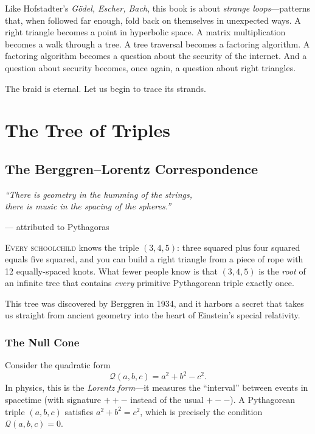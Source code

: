 \documentclass[11pt,twoside,openright]{book}
\theoremstyle{definition}
\newcommand{\lorentzQ}{\mathcal{Q}}
\begin{document}
Like Hofstadter's \emph{G\"odel, Escher, Bach}, this book is about
\emph{strange loops}---patterns that, when followed far enough, fold back
on themselves in unexpected ways. A right triangle becomes a point in
hyperbolic space. A matrix multiplication becomes a walk through a tree.
A tree traversal becomes a factoring algorithm. A factoring algorithm
becomes a question about the security of the internet. And a question
about security becomes, once again, a question about right triangles.

The braid is eternal. Let us begin to trace its strands.

\part{The Tree of Triples}

\chapter{The Berggren--Lorentz Correspondence}
\label{ch:berggren-lorentz}

\epigraph{\itshape ``There is geometry in the humming of the strings,\\
there is music in the spacing of the spheres.''}
{--- attributed to Pythagoras}

\lettrine[lines=3]{E}{very schoolchild} knows the triple $(3,4,5)$: three
squared plus four squared equals five squared, and you can build a right
triangle from a piece of rope with 12 equally-spaced knots. What fewer
people know is that $(3,4,5)$ is the \emph{root} of an infinite tree that
contains \emph{every} primitive Pythagorean triple exactly once.

This tree was discovered by Berggren in 1934, and it harbors a
secret that takes us straight from ancient geometry into the heart of
Einstein's special relativity.

\section{The Null Cone}

Consider the quadratic form
\[
\lorentzQ(a,b,c) = a^2 + b^2 - c^2.
\]
In physics, this is the \emph{Lorentz form}---it measures the ``interval''
between events in spacetime (with signature $++-$ instead of the usual
$+--$). A Pythagorean triple $(a,b,c)$ satisfies $a^2+b^2=c^2$, which
is precisely the condition $\lorentzQ(a,b,c) = 0$.
\end{document}
